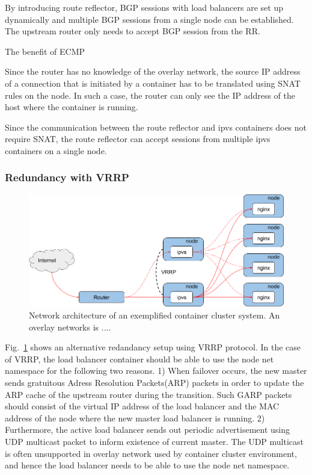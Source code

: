 By introducing route reflector, BGP sessions with load balancers are set up dynamically and multiple BGP sessions from a single node can be established.
The upstream router only needs to accept BGP session from the RR.

The benefit of ECMP


Since the router has no knowledge of the overlay network, 
the source IP address of a connection that is initiated by a container has to be translated using SNAT rules on the node. 
In such a case, the router can only see the IP address of the host where the container is running. 


Since the communication between the route reflector and ipvs containers does not require SNAT, 
the route reflector can accept sessions from multiple ipvs containers on a single node.    

\subsubsection{Redundancy with VRRP}

\begin{figure}[tb]
\begin{center}
\includegraphics[width=\columnwidth]{Figs/vrrp.png}
\end{center}
\caption{Network architecture of an exemplified container cluster system. An overlay networks is .... }
\label{fig:vrrp}
\end{figure}

Fig.~\ref{fig:vrrp} shows an alternative redandancy setup using VRRP protocol.
In the case of VRRP, the load balancer container should be able to use the node net namespace for the following two reasons.
1) When failover occurs, the new master sends gratuitous Adress Resolution Packets(ARP) packets in order to update the ARP cache of the upstream router during the transition.
Such GARP packets should consist of the virtual IP address of the load balancer and the MAC address of the node where the new master load balancer is running.
%
2) Furthermore, the active load balancer sends out periodic advertisement using UDP multicast packet to inform existence of current master.
The UDP multicast is often unsupported in overlay network used by container cluster environment, and hence the load balancer needs to be able to use the node net namespace.

